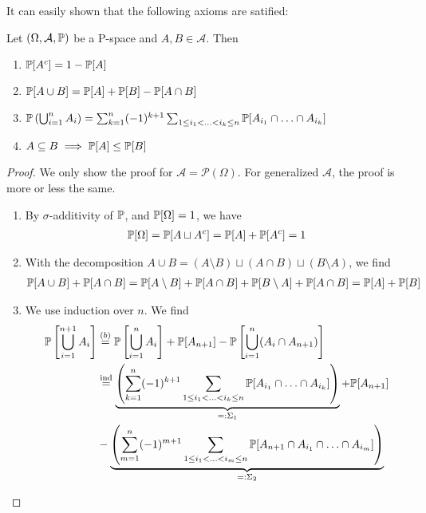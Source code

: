 It can easily shown that the following axioms are satified:
\begin{lem}[] \label{lem:IP-properties}
  Let $(\Omega,\mathcal{A},\mathbb{P})$ be a P-space and $A,B \in  \mathcal{A}$. Then
\begin{enumerate}
  \item $\mathbb{P}[A^{c}] = 1 - \mathbb{P}[A]$
  \item $\mathbb{P}[A\cup B] = \mathbb{P}[A] + \mathbb{P}[B] - \mathbb{P}[A \cap B]$
  \item $\mathbb{P}\left(\bigcup_{i = 1}^n A_i\right) = \sum_{k=1}^n (-1)^{k+1} \sum_{1 \leq i_1 <\ldots < i_k \leq n} \mathbb{P}[A_{i_1} \cap \ldots \cap A_{i_k}]$
  \item $A \subseteq B \implies \mathbb{P}[A] \leq \mathbb{P}[B]$
\end{enumerate}
\end{lem}
\begin{proof}
  We only show the proof for $\mathcal{A} = \mathcal{P}(\Omega)$. For generalized $\mathcal{A}$, the proof is more or less the same.
  \begin{enumerate}
    \item By $\sigma$-additivity of $\mathbb{P}$, and $\mathbb{P}[\Omega] = 1$, we have
      \begin{align*}
        \mathbb{P}[\Omega] = \mathbb{P}[A \sqcup A^{c}] = \mathbb{P}[A] + \mathbb{P}[A^{c}] = 1
      \end{align*}
    \item With the decomposition $A \cup B = (A \setminus B) \sqcup (A \cap B) \sqcup (B \setminus A)$, we find
    \begin{align*}
      \mathbb{P}[A \cup B] + \mathbb{P}[A \cap B] = \mathbb{P}[A \setminus B] + \mathbb{P}[A \cap B] + \mathbb{P}[B \setminus A] + \mathbb{P}[A \cap B] = \mathbb{P}[A] + \mathbb{P}[B]
    \end{align*}
  \item We use induction over $n$. We find
    \begin{align*}
      \mathbb{P}\left[\bigcup_{i=1}^{n+1}A_i\right]
      &\stackrel{(b)}{=}
      \mathbb{P}\left[\bigcup_{i=1}^{n}A_i\right] + \mathbb{P}[A_{n+1}] - \mathbb{P} \left[\bigcup_{i=1}^{n}(A_i \cap A_{n+1})\right]\\
      &\stackrel{\text{ind}}{=} 
      \underbrace{\left(\sum_{k=1}^{n}(-1)^{k+1} \sum_{1 \leq i_1 < \ldots < i_k \leq n} \mathbb{P}[A_{i_1} \cap \ldots \cap A_{i_k}] \right)}_{=: \Sigma_1} + \mathbb{P}[A_{n+1}]\\
      &- 
      \underbrace{
      \left(
        \sum_{m=1}^{n}
        (-1)^{m+1} \sum_{1 \leq i_1 < \ldots < i_m \leq n} \mathbb{P}[A_{n+1} \cap A_{i_1} \cap \ldots \cap A_{i_m}]
      \right)
    }_{=: \Sigma_2}
    \end{align*}


\end{enumerate}
\end{proof}
